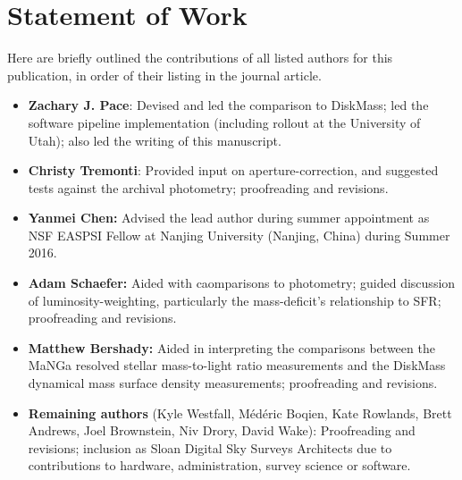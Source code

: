 \chapappendix

\section{Statement of Work}
\label{chap2:apdx:statement_of_work}

Here are briefly outlined the contributions of all listed authors for this publication, in order of their listing in the journal article.

\begin{itemize}
    \item \textbf{Zachary J. Pace}: Devised and led the comparison to DiskMass; led the software pipeline implementation (including rollout at the University of Utah); also led the writing of this manuscript.
    \item \textbf{Christy Tremonti}: Provided input on aperture-correction, and suggested tests against the archival photometry; proofreading and revisions.
    \item \textbf{Yanmei Chen:} Advised the lead author during summer appointment as NSF EASPSI Fellow at Nanjing University (Nanjing, China) during Summer 2016.
    \item \textbf{Adam Schaefer:} Aided with caomparisons to photometry; guided discussion of luminosity-weighting, particularly the mass-deficit's relationship to SFR; proofreading and revisions.
    \item \textbf{Matthew Bershady:} Aided in interpreting the comparisons between the MaNGa resolved stellar mass-to-light ratio measurements and the DiskMass dynamical mass surface density measurements; proofreading and revisions.
    \item \textbf{Remaining authors} (Kyle Westfall, M\'{e}d\'{e}ric Boqien, Kate Rowlands, Brett Andrews, Joel Brownstein, Niv Drory, David Wake): Proofreading and revisions; inclusion as Sloan Digital Sky Surveys Architects due to contributions to hardware, administration, survey science or software.
\end{itemize}

\endchapappendix